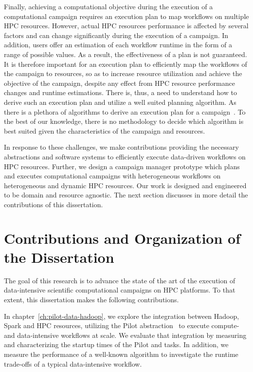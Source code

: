 Finally, achieving a computational objective during the execution of a
computational campaign requires an execution plan to map workflows on multiple
HPC resources. However, actual HPC resources performance is affected by several
factors and can change significantly during the execution of a campaign. In
addition, users offer an estimation of each workflow runtime in the form of a
range of possible values. As a result, the effectiveness of a plan is not
guaranteed. It is therefore important for an execution plan to efficiently map
the workflows of the campaign to resources, so as to increase resource
utilization and achieve the objective of the campaign, despite any effect from
HPC resource performance changes and runtime estimations. There is, thus, a need
to understand how to derive such an execution plan and utilize a well suited
planning algorithm. As there is a plethora of algorithms to derive an execution
plan for a campaign~\cite{lu2019review}. To the best of our knowledge, there is
no methodology to decide which algorithm is best suited given the
characteristics of the campaign and resources.

In response to these challenges, we make contributions providing the necessary
abstractions and software systems to efficiently execute data-driven workflows
on HPC resources. Further, we design a campaign manager prototype which plans
and executes computational campaigns with heterogeneous workflows on
heterogeneous and dynamic HPC resources. Our work is designed and engineered to
be domain and resource agnostic. The next section discusses in more detail the
contributions of this dissertation.

\section{Contributions and Organization of the Dissertation}

The goal of this research is to advance the state of the art of the execution of
data-intensive scientific computational campaigns on HPC platforms. To that
extent, this dissertation makes the following contributions.

In chapter~\ref{ch:pilot-data-hadoop}, we explore the integration between
Hadoop, Spark and HPC resources, utilizing the Pilot
abstraction~\cite{luckow2012pstar,turilli2018comprehensive} to execute compute-
and data-intensive workflows at scale. We evaluate that integration by measuring
and characterizing the startup times of the Pilot and tasks. In addition, we
measure the performance of a well-known algorithm to investigate the runtime
trade-offs of a typical data-intensive workflow.

